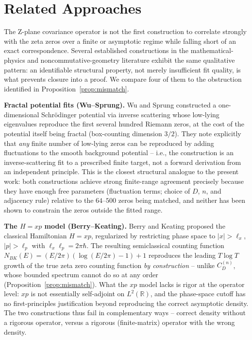 \documentclass[11pt,a4paper]{article}
\begin{document}
\section{Related Approaches}
\label{sec:related}

The Z-plane covariance operator is not the first construction to correlate
strongly with the zeta zeros over a finite or asymptotic regime while
falling short of an exact correspondence. Several established constructions
in the mathematical-physics and noncommutative-geometry literature exhibit
the same qualitative pattern: an identifiable structural property, not
merely insufficient fit quality, is what prevents closure into a proof.
We compare four of them to the obstruction identified in
Proposition~\ref{prop:mismatch}.

\textbf{Fractal potential fits (Wu--Sprung).} Wu and Sprung
\cite{wusprung1993} constructed a one-dimensional Schr\"{o}dinger potential
via inverse scattering whose low-lying eigenvalues reproduce the first
several hundred Riemann zeros, at the cost of the potential itself being
fractal (box-counting dimension $3/2$). They note explicitly that
\emph{any} finite number of low-lying zeros can be reproduced by adding
fluctuations to the smooth background potential -- i.e., the construction
is an inverse-scattering fit to a prescribed finite target, not a forward
derivation from an independent principle. This is the closest structural
analogue to the present work: both constructions achieve strong finite-range
agreement precisely because they have enough free parameters (fluctuation
terms; choice of $D$, $n$, and adjacency rule) relative to the $64$--$500$
zeros being matched, and neither has been shown to constrain the zeros
outside the fitted range.

\textbf{The $H=xp$ model (Berry--Keating).} Berry and Keating
\cite{berrykeating1999} proposed the classical Hamiltonian $H=xp$,
regularized by restricting phase space to $|x|>\ell_x$, $|p|>\ell_p$ with
$\ell_x\ell_p=2\pi\hbar$. The resulting semiclassical counting function
$N_{BK}(E) = (E/2\pi)(\log(E/2\pi)-1)+1$ reproduces the leading
$T\log T$ growth of the true zeta zero counting function \emph{by
construction} -- unlike $C_D^{(n)}$, whose bounded spectrum cannot do so
at any order (Proposition~\ref{prop:mismatch}). What the $xp$ model lacks
is rigor at the operator level: $xp$ is not essentially self-adjoint on
$L^2(\mathbb{R})$, and the phase-space cutoff has no first-principles
justification beyond reproducing the correct asymptotic density. The two
constructions thus fail in complementary ways -- correct density without a
rigorous operator, versus a rigorous (finite-matrix) operator with the
wrong density.
\end{document}
